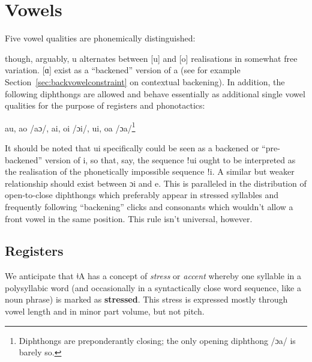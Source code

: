 \documentclass[11pt,a5paper]{book}
\newcommand{\qcn}[1]{\textcolor{AccentText}{\large#1}}
\newcommand{\langname}{\qcn{ǂA}}
\begin{document}
\section{Vowels}

Five vowel qualities are phonemically distinguished:

\begin{center}
    \begin{vowel}
        \putcvowel{\qcn{i}}{1}
        \putcvowel{\qcn{e}}{2}
        \putcvowel{\qcn{a}}{4}
        \putcvowel{\qcn{o} /ɔ/}{6}
        \putcvowel{\qcn{u}}{8}
    \end{vowel}
\end{center}

though, arguably, \qcn{u} alternates between [u] and [o] realisations in somewhat free variation. [ɑ] exist as a ``backened'' version of \qcn{a} (see for example Section~\ref{sec:backvowelconstraint} on contextual backening). In addition, the following diphthongs are allowed and behave essentially as additional single vowel qualities for the purpose of registers and phonotactics:

\begin{center}
\qcn{au}, \qcn{ao} /aɔ/, \qcn{ai}, \qcn{oi} /ɔi/, \qcn{ui}, \qcn{oa} /ɔa/\footnote{Diphthongs are preponderantly closing; the only opening diphthong /ɔa/ is barely so.}
\end{center}

It should be noted that \qcn{ui} specifically could be seen as a backened or ``pre-backened'' version of \qcn{i}, so that, say, the sequence \qcn{ǃui} ought to be interpreted as the realisation of the phonetically impossible sequence \qcn{ǃi}. A similar but weaker relationship should exist between \qcn{ɔi} and \qcn{e}. This is paralleled in the distribution of open-to-close diphthongs which preferably appear in stressed syllables and frequently following ``backening'' clicks and consonants which wouldn't allow a front vowel in the same position. This rule isn't universal, however.

\subsection{Registers}

We anticipate that \langname{} has a concept of \emph{stress} or \emph{accent} whereby one syllable in a polysyllabic word (and occasionally in a syntactically close word sequence, like a noun phrase) is marked as \textbf{stressed}. This stress is expressed mostly through vowel length and in minor part volume, but not pitch.
\end{document}
